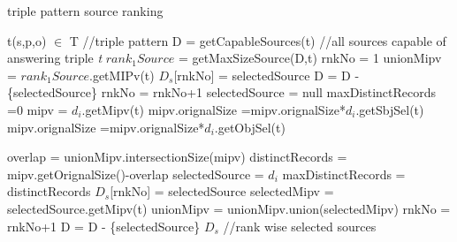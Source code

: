 \documentclass{sig-alternate}  %
\begin{document}
\begin{algorithm}
\caption{triple pattern source ranking}
\begin{algorithmic} [1]
\REQUIRE  t(s,p,o) $\in$ T  //triple pattern 
\STATE D = getCapableSources(t) //all sources capable of answering triple \emph{t}
\STATE $rank_1Source$ = getMaxSizeSource(D,t)
\STATE rnkNo = 1
\STATE unionMipv = $rank_1Source$.getMIPv(t) 
\STATE $D_{s}$[rnkNo] = selectedSource
\STATE D = D - \{selectedSource\}
\STATE rnkNo = rnkNo+1
\STATE selectedSource = null
\STATE maxDistinctRecords =0
\STATE mipv = $d_i$.getMipv(t)
\STATE mipv.orignalSize =mipv.orignalSize*$d_i$.getSbjSel(t)
\STATE mipv.orignalSize =mipv.orignalSize*$d_i$.getObjSel(t)
\ENDIF

\STATE overlap = unionMipv.intersectionSize(mipv)
\STATE distinctRecords = mipv.getOrignalSize()-overlap
\STATE selectedSource = $d_i$
\STATE maxDistinctRecords = distinctRecords
\ENDIF
\ENDFOR
{}
\STATE $D_{s}$[rnkNo] = selectedSource
\STATE selectedMipv = selectedSource.getMipv(t)
\STATE  unionMipv =  unionMipv.union(selectedMipv)
\STATE rnkNo = rnkNo+1
\ENDIF
\STATE D = D - \{selectedSource\}
\ENDWHILE
\RETURN $D_{s}$  //rank wise selected sources
\end{algorithmic}
\end{algorithm}
\end{document}
